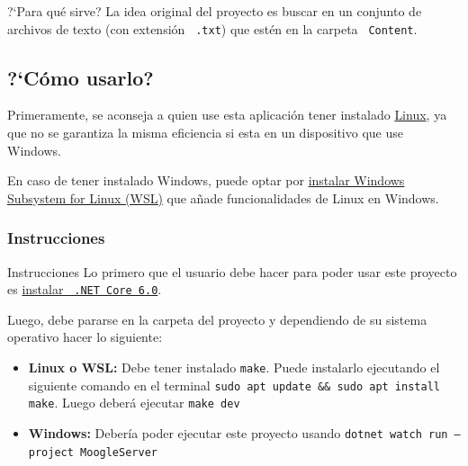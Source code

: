 \documentclass{beamer}
\begin{document}
\begin{frame}{?`Para qu\'e sirve?}
  La idea original del proyecto es buscar en un conjunto de archivos de texto
  (con extensión {\tt \color{gray45} .txt}) que estén en la carpeta {\tt
      \color{gray45}Content}.
\end{frame}

\subsection*{?`C\'omo usarlo?}

\begin{frame}
  Primeramente, se aconseja a quien use esta aplicaci\'on tener instalado
  \href{https://es.wikipedia.org/wiki/Linux}{Linux}, ya que no se garantiza la
  misma eficiencia si esta en un dispositivo que use Windows.
\end{frame}

\begin{frame}
  En caso de tener instalado Windows, puede optar por
  \href{https://learn.microsoft.com/es-es/windows/wsl/install}{instalar Windows
    Subsystem for Linux (WSL)} que a\~nade funcionalidades de Linux en Windows.
\end{frame}

\subsubsection*{Instrucciones}

\begin{frame}{Instrucciones}
  Lo primero que el usuario debe hacer para poder usar este proyecto es
  \href{https://learn.microsoft.com/es-es/dotnet/core/install/}{instalar {\tt
        .NET Core 6.0}}.

  \pause

  Luego, debe pararse en la carpeta del proyecto y dependiendo de su sistema
  operativo hacer lo siguiente:

  \begin{itemize}[<+->]
    \item {\bf Linux o WSL:} Debe tener instalado {\tt make}. Puede instalarlo ejecutando el siguiente comando en el terminal {\tt sudo apt update \&\& sudo apt install make}. Luego deber\'a ejecutar {\tt make dev}
    \item {\bf Windows:}  Debería poder ejecutar este proyecto usando {\tt dotnet watch run --project MoogleServer}
  \end{itemize}
\end{frame}
\end{document}
